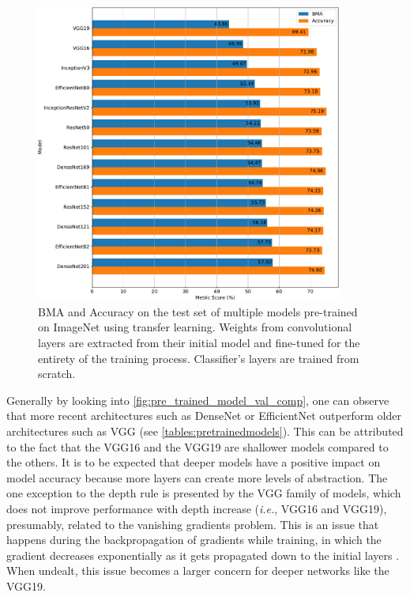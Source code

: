     \begin{figure}[ht]
        \centering
        \includegraphics[width=0.9\textwidth]{figs/pre_trained_models_ft_comp_horizontal.pdf}
        \caption[Comparison of pre-trained models with fine-tuned convolutional base]{\ac{BMA} and Accuracy on the test set of multiple models pre-trained on ImageNet using transfer learning. Weights from convolutional layers are extracted from their initial model and fine-tuned for the entirety of the training process. Classifier's layers are trained from scratch.}
        \label{fig:pre_trained_model_val_comp}
    \end{figure}
    
    Generally by looking into \autoref{fig:pre_trained_model_val_comp}, one can observe that more recent architectures such as DenseNet or EfficientNet outperform older architectures such as VGG (see \autoref{tables:pretrainedmodels}). This can be attributed to the fact that the VGG16 and the VGG19 are shallower models compared to the others. It is to be expected that deeper models have a positive impact on model accuracy because more layers can create more levels of abstraction. The one exception to the depth rule is presented by the VGG family of models, which does not improve performance with depth increase (\textit{i.e.}, VGG16 and VGG19), presumably, related to the vanishing gradients problem. This is an issue that happens during the backpropagation of gradients while training, in which the gradient decreases exponentially as it gets propagated down to the initial layers \cite{Nielsen2017a}. When undealt, this issue becomes a larger concern for deeper networks like the VGG19. \par 
    
